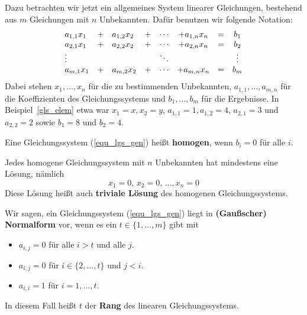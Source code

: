 \bigbreak

Dazu betrachten wir jetzt ein allgemeines System linearer Gleichungen, bestehend aus $m$ Gleichungen mit $n$ 
 Unbekannten. Dafür benutzen wir folgende Notation:
  	\begin{equation}\label{equ_lgs_gen} 
  	\begin{array} {l c l c c c l c l }
  	a_{1,1} x_1 & + & a_{1,2} x_2 & + & \cdots & + a_{1,n} x_n & = & b_1 \\
  	a_{2,1} x_1 & + & a_{2,2} x_2 & + & \cdots & + a_{2,n} x_n & = & b_2 \\
  	\vdots & & & & \ddots & & & \vdots \\
  	a_{m,1} x_1 & + & a_{m,2} x_2 & + & \cdots & + a_{m,n} x_n & = & b_m 
  	\end{array} 
  	\end{equation}  
Dabei stehen $x_1, \ldots, x_n$ für die zu bestimmenden Unbekannten, $a_{1,1}, \ldots , a_{m,n}$ für die 
Koeffizienten des Gleichungssystems und $b_1, \ldots, b_m$ für die Ergebnisse. In Beispiel~\ref{gls_elem} 
etwa war $x_1 = x, x_2 = y$, $a_{1,1} = 1, a_{1,2} = 4$, $a_{2,1} = 3$ und $a_{2,2} = 2$ sowie $b_1 = 8$ und 
$b_2 = 4$. 

\begin{definition} Eine Gleichungssystem (\ref{equ_lgs_gen}) heißt 
\textbf{homogen}, wenn $b_i = 0$ für alle $i$.
\end{definition}


\begin{notiz} Jedes homogene Gleichungssystem mit $n$ Unbekannten hat mindestens eine Lösung, nämlich
   	$$ x_1 = 0, \, x_2 = 0, \, \ldots , x_n = 0 $$
Diese Lösung heißt auch \textbf{triviale Lösung} des homogenen Gleichungssystems.
\end{notiz}

\begin{definition} Wir sagen, ein Gleichungssystem (\ref{equ_lgs_gen}) liegt in 
\textbf{(Gaußscher) Normalform} vor, 
wenn es ein $t \in \{1, \ldots, m \}$ gibt mit
\begin{itemize}
\item $a_{i,j} = 0$ für alle $i > t$ und alle $j$.
\item $a_{i,j} = 0$ für $i \in \{2, \ldots, t\}$ und $j < i$.
\item $a_{i,i} = 1$ für $i = 1, \ldots, t$.
\end{itemize}
In diesem Fall heißt $t$ der  \textbf{Rang} des linearen 
Gleichungssystems.
\end{definition}

